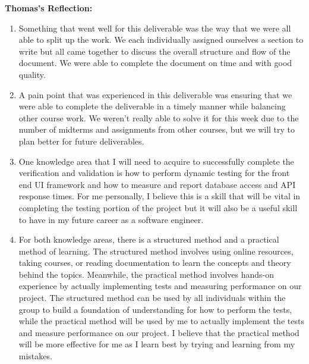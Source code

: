 \documentclass[12pt, titlepage]{article}
\begin{document}
\noindent\textbf{Thomas's Reflection:}
\begin{enumerate}
  \item Something that went well for this deliverable was the way that we were all able to split up the work.
  We each individually assigned ourselves a section to write but all came together to discuss the overall structure
  and flow of the document. We were able to complete the document on time and with good quality.
  \item A pain point that was experienced in this deliverable was ensuring that we were able to complete the deliverable
  in a timely manner while balancing other course work. We weren't really able to solve it for this week due to 
  the number of midterms and assignments from other courses, but we will try to plan better for future deliverables.
  \item One knowledge area that I will need to acquire to successfully complete the verification and validation is 
  how to perform dynamic testing for the front end UI framework and how to measure and report database access and API 
  response times. For me personally, I believe this is a skill that will be vital in completing the testing portion of 
  the project but it will also be a useful skill to have in my future career as a software engineer.
  \item For both knowledge areas, there is a structured method and a practical method of learning. The structured method
  involves using online resources, taking courses, or reading documentation to learn the concepts and theory behind the 
  topics. Meanwhile, the practical method involves hands-on experience by actually implementing tests and measuring performance
  on our project. The structured method can be used by all individuals within the group to build a foundation of understanding
  for how to perform the tests, while the practical method will be used by me to actually implement the tests and measure performance
  on our project. I believe that the practical method will be more effective for me as I learn best by trying and learning
  from my mistakes.
\end{enumerate}
\end{document}
